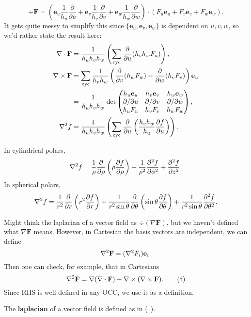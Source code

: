 \[
    \div \mathbf{F} = \left( \mathbf{e}_u \frac{1}{h_u}\frac{\partial }{\partial u} +\mathbf{e}_v \frac{1}{h_v}\frac{\partial }{\partial v}+\mathbf{e}_w \frac{1}{h_w}\frac{\partial }{\partial w}\right)\cdot (F_u\mathbf{e}_u+F_v\mathbf{e}_v+F_w\mathbf{e}_w).
\]
It gets quite messy to simplify this since $ \{\mathbf{e}_u,\mathbf{e}_v,\mathbf{e}_w\} $ is dependent on $u,v,w$, so we'd rather state the result here:
\begin{align*}
    \div \mathbf{F}&=\frac{1}{h_uh_vh_w}\left(\sum_{\text{cyc}} \frac{\partial }{\partial u}(h_vh_wF_u)\right),\\ 
    \curl \mathbf{F} &= \sum_{\text{cyc}} \frac{1}{h_vh_w}\left( \frac{\partial }{\partial v}(h_wF_w)-\frac{\partial }{\partial w}(h_vF_v)   \right)\mathbf{e}_u\\ 
    &= \frac{1}{h_uh_vh_w}\det \begin{pmatrix}
        h_u\mathbf{e}_u & h_v\mathbf{e}_v & h_w\mathbf{e}_w \\
        \partial /\partial u  & \partial /\partial v & \partial /\partial w \\
        h_uF_u & h_vF_v & h_wF_w \\
    \end{pmatrix},\\ 
    \laplacian f &= \frac{1}{h_uh_vh_w}\left( \sum_{\text{cyc}}\frac{\partial }{\partial u}\left( \frac{h_vh_w}{h_u}\frac{\partial f}{\partial u}  \right)  \right).
\end{align*}

\begin{example}
    In cylindrical polars,
    \[
        \laplacian f = \frac{1}{\rho} \frac{\partial }{\partial \rho}\left( \rho \frac{\partial f}{\partial \rho}  \right) +\frac{1}{\rho^2}\frac{\partial ^2 f}{\partial \phi^2} +\frac{\partial ^2f}{\partial z^2}. 
    \]
    In spherical polars,
    \[
        \laplacian f = \frac{1}{r^2}\frac{\partial }{\partial r}\left( r^2 \frac{\partial f}{\partial r} \right)+\frac{1}{r^2\sin \theta}\frac{\partial }{\partial \theta}\left( \sin\theta\frac{\partial f}{\partial \theta}  \right)+\frac{1}{r^2\sin\theta}\frac{\partial ^2 f}{\partial \theta^2}.   
    \]
\end{example}

Might think the laplacian of a vector field as $ \div (\nabla \mathbf{F}) $, but we haven't defined what $ \nabla \mathbf{F} $ means. However, in Cartesian the basis vectors are independent, we can define 
\[
    \laplacian \mathbf{F} = (\laplacian F_i) \mathbf{e}_i.
\]
Then one can check, for example, that in Cartesians
\[
    \laplacian \mathbf{F} = \nabla (\div \mathbf{F}) - \curl (\curl \mathbf{F}).\tag{$\dagger$}
\]
Since RHS is well-defined in any OCC, we use it as a definition.
\begin{definition}
    The \textbf{laplacian} of a vector field is defined as in ($\dagger$).
\end{definition}

